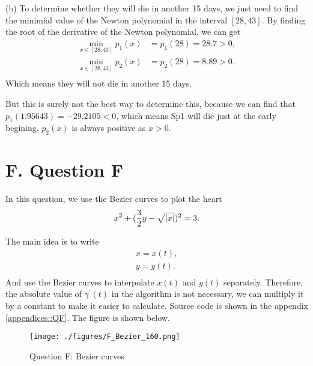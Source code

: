 \documentclass[a4paper]{article}
\begin{document}
(b) To determine whether they will die in another 15 days, we just need to find the minimial value of the Newton polynomial in the interval $[28,43]$. By finding the root of the derivative of the Newton polynomial, we can get
\begin{equation}
	\begin{aligned}
		\min_{x\in[28,43]} p_1(x) &= p_1(28) = 28.7 > 0, \\
		\min_{x\in[28,43]} p_2(x) &= p_2(28) = 8.89 > 0. \\
	\end{aligned}
\end{equation}
Which means they will not die in another 15 days.

But this is surely not the best way to determine this, because we can find that $p_1(1.95643) = -29.2105 < 0$, which means Sp1 will die just at the early begining. $p_2(x)$ is always positive as $x>0$. 

\section*{F. Question F}

In this question, we use the Bezier curves to plot the heart 
\begin{equation}
	x^2 + (\frac{3}{2}y - \sqrt{\abs{x}})^2 = 3.
\end{equation}

The main idea is to write
\begin{equation}
	\begin{aligned}
		x = x(t), \\
		y = y(t). \\
	\end{aligned}
\end{equation}
And use the Bezier curves to interpolate $x(t)$ and $y(t)$ separately. Therefore, the absolute value of $\gamma^{\prime}(t)$ in the algorithm is not necessary, we can multiply it by a constant to make it easier to calculate. Source code is shown in the appendix \ref{appendices::QF}. The figure is shown below.
\begin{figure}[H]
	\centering
\end{figure}
\begin{figure}[H]
	\centering
	\texttt{[image: ./figures/F\_Bezier\_160.png]}
	\caption{Question F: Bezier curves}
\end{figure}
\end{document}

